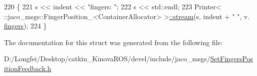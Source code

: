 \begin{DoxyCode}
220   \{
221     s << indent << \textcolor{stringliteral}{"fingers: "};
222     s << std::endl;
223     Printer< ::jaco\_msgs::FingerPosition\_<ContainerAllocator> >\hyperlink{structros_1_1message__operations_1_1Printer_3_01_1_1jaco__msgs_1_1SetFingersPositionFeedback___3_01ContainerAllocator_01_4_01_4_a02578137aa537ae0b96fff598c605093}{::stream}(s, indent + \textcolor{stringliteral}{"  "}, v.
      \hyperlink{structjaco__msgs_1_1SetFingersPositionFeedback___ae2565d164d4f0daf1be357023e5d0be2}{fingers});
224   \}
\end{DoxyCode}


The documentation for this struct was generated from the following file\+:\begin{DoxyCompactItemize}
\item 
D\+:/\+Longfei/\+Desktop/catkin\+\_\+\+Kinova\+R\+O\+S/devel/include/jaco\+\_\+msgs/\hyperlink{SetFingersPositionFeedback_8h}{Set\+Fingers\+Position\+Feedback.\+h}\end{DoxyCompactItemize}
